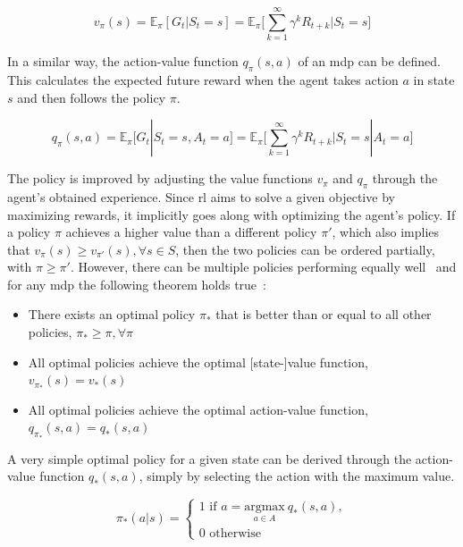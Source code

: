 \documentclass[draft,final]{vutinfth} %
\newcommand{\p}[1]{see p. #1}
\begin{document}
    \begin{equation}
        v_\pi(s) = \mathbb{E}_\pi[G_t|S_t = s] = \mathbb{E}_\pi \Bigg[\sum_{k=1}^{\infty} \gamma^k R_{t+k} \bigg| S_t = s \Bigg]\label{eq:value_function}
    \end{equation}

    In a similar way, the action-value function $q_\pi(s,a)$ of an \gls{mdp} can be defined.
    This calculates the expected future reward when the agent takes action $a$ in state $s$ and then follows the policy $\pi$.

    \begin{equation}
        q_\pi(s,a) = \mathbb{E}_\pi[G_t|S_t = s, A_t = a] = \mathbb{E}_\pi \Bigg[\sum_{k=1}^{\infty} \gamma^k R_{t+k} \bigg| S_t = s | A_t = a \Bigg]\label{eq:quality_function}
    \end{equation}

    The policy is improved by adjusting the value functions $v_\pi$ and $q_\pi$ through the agent's obtained experience.
    Since \gls{rl} aims to solve a given objective by maximizing rewards, it implicitly goes along with optimizing the agent's policy.
    If a policy $\pi$ achieves a higher value than a different policy $\pi'$, which also implies that $v_\pi(s) \geq v_{\pi'}(s), \forall s \in \mathit{S}$, then the two policies can be ordered partially, with $\pi \geq \pi'$.
    However, there can be multiple policies performing equally well~\citep{sutton_reinforcement_2018} and for any \gls{mdp} the following theorem holds true~\citepOnline[\p{43}]{silver_lecture_2015-1}:

    \begin{itemize}
        \item There exists an optimal policy $\pi_*$ that is better than or equal to all other policies, $\pi_* \geq \pi, \forall\pi$
        \item All optimal policies achieve the optimal [state-]value function, $v_{\pi_*}(s) = v_*(s)$
        \item All optimal policies achieve the optimal action-value function, $q_{\pi_*}(s,a) = q_*(s,a)$
    \end{itemize}

    A very simple optimal policy for a given state can be derived through the action-value function $q_*(s,a)$, simply by selecting the action with the maximum value.

    \begin{equation}
        \pi_*(a|s) =
        \begin{cases}
            1 \text{ if } a =  \underset{a \in \mathit{A}}{\text{argmax}}\ q_*(s,a),\\
            0 \text{ otherwise }
        \end{cases}
    \end{equation}
\end{document}
